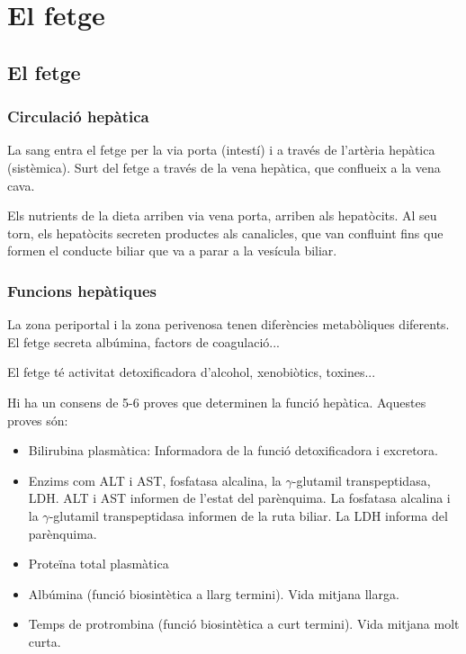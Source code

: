 \section{El fetge}
\label{sec:el-fetge}

\subsection{El fetge}
\label{sec:el-fetge-1}

\subsubsection{Circulació hepàtica}
\label{sec:circulacio-hepatica}
La sang entra el fetge per la via porta (intestí) i a través de l'artèria hepàtica (sistèmica). Surt del fetge a través de la vena hepàtica, que conflueix a la vena cava.

Els nutrients de la dieta arriben via vena porta, arriben als hepatòcits. Al seu torn, els hepatòcits secreten productes als canalicles, que van confluint fins que formen el conducte biliar que va a  parar a la vesícula biliar.

\subsubsection{Funcions hepàtiques}
\label{sec:funcions-hepatiques}
La zona periportal i la zona perivenosa tenen diferències metabòliques diferents. El fetge secreta albúmina, factors de coagulació...

El fetge té activitat detoxificadora d'alcohol, xenobiòtics, toxines... 

Hi ha un consens de 5-6 proves que determinen la funció hepàtica. Aquestes proves són:
\begin{itemize}
\item Bilirubina plasmàtica: Informadora de la funció detoxificadora i excretora.

\item Enzims com ALT i AST, fosfatasa alcalina, la $\gamma$-glutamil transpeptidasa, LDH. ALT i AST informen de l'estat del parènquima. La fosfatasa alcalina i la $\gamma$-glutamil transpeptidasa informen de la ruta biliar. La LDH informa del parènquima.

\item Proteïna total plasmàtica

\item Albúmina (funció biosintètica a llarg termini). Vida mitjana llarga.
 
\item Temps de protrombina (funció biosintètica a curt termini). Vida mitjana molt curta.
\end{itemize}

